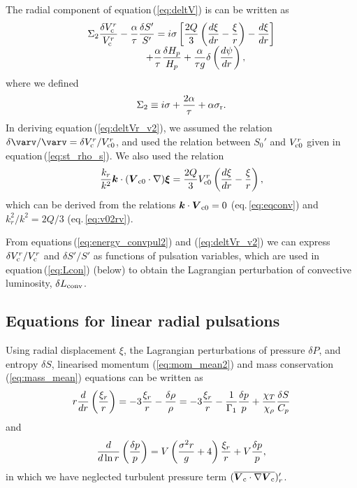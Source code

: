 \documentclass[fleqn,usenatbib]{mnras}
\def\bm#1{\mbox{\boldmath$#1$}}
\begin{document}
The radial component of equation\,(\ref{eq:deltV}) is can be written as
\begin{equation}
\begin{array}{ll}\displaystyle
\Sigma_2{\delta V^r_{\rm c}\over V_{\rm c}^r} 
-{\alpha\over\tau}{\delta S'\over S'}
= i\sigma\left[{2Q\over3}\left({d\xi\over dr}-{\xi\over r}\right)
 -{d\xi\over dr}\right] 
\cr \displaystyle \qquad \qquad\qquad
+{\alpha\over\tau}{\delta H_p\over H_p}
+{\alpha\over\tau g}\delta\left({d\psi\over dr}\right),
\end{array}
\label{eq:deltVr_v2}
\end{equation}
where we defined
\begin{equation}
\Sigma_2\equiv i\sigma+{2\alpha\over\tau}+\alpha\sigma_{\rm r}.
\label{eq:Sigma2}
\end{equation}
In deriving equation\,(\ref{eq:deltVr_v2}),
we assumed the relation $\delta\varv/\varv = \delta V_{\rm c}^r/V_{\rm c0}^r$, 
and used the relation between $S_0'$ and $V_{{\rm c}0}^r$ given in equation\,(\ref{eq:st_rho_s}). 
We also used the relation
\begin{equation}
{k_r\over k^2}\bm{k}\cdot(\bm{V}_{\rm c0}\cdot\nabla)\bm{\xi}
={2Q\over3}V_{\rm c0}^r\left({d\xi\over dr}-{\xi\over r}\right),
\end{equation}
which can be derived from the relations $\bm{k}\cdot\bm{V}_{\rm c0} = 0$
(eq.\,\ref{eq:eqconv})
and $k_r^2/k^2= 2Q/3$ (eq.\,\ref{eq:v02rv}).

From equations\,(\ref{eq:energy_convpul2}) and (\ref{eq:deltVr_v2})
we can express $\delta V^r_{\rm c}/V^r_{\rm c}$ and $\delta S'/S'$ 
as functions of pulsation variables, which are used 
in equation\,(\ref{eq:Lcon}) (below) to obtain the Lagrangian 
perturbation of convective luminosity, $\delta L_{\rm conv}$. 



\subsection{Equations for linear radial pulsations}
Using radial displacement $\xi$, the Lagrangian perturbations of pressure 
$\delta P$, and entropy $\delta S$, 
linearised momentum (\ref{eq:mom_mean2}) and 
mass conservation (\ref{eq:mass_mean}) equations can be written as
\begin{equation}
r{d\over dr}\left({\xi_r\over r}\right)= -3{\xi_r\over r} - {\delta\rho\over\rho} 
= -3{\xi_r\over r} - {1\over\Gamma_1}{\delta p\over p} +{\chi_T\over\chi_\rho}{\delta S\over C_p}
\label{eq:dxidr}
\end{equation}
and
\begin{equation}
{d\over d\ln r}\left(\delta p\over p\right) =
V\left({\sigma^2r\over g}+4\right){\xi_r\over r}+ V{\delta p\over p}, 
\label{eq:delpdr}
\end{equation}
in which we have neglected 
turbulent pressure term $(\overline{\bm{V}_{\rm c}\cdot\nabla\bm{V}_{\rm c}})'_r$.
  
\end{document}
